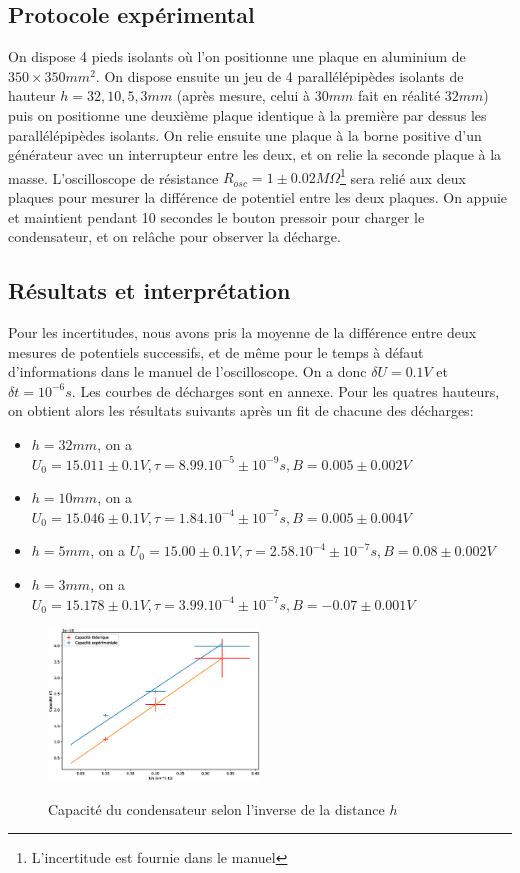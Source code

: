 \documentclass[12pt]{article}
\begin{document}
	\subsection{Protocole expérimental}
	On dispose 4 pieds isolants où l'on positionne une plaque en aluminium de $350\times 350mm^2$. On dispose ensuite un jeu de 4 parallélépipèdes isolants de hauteur $h = 32, 10, 5, 3mm$ (après mesure, celui à $30mm$ fait en réalité $32mm$) puis
	on positionne une deuxième plaque identique à la première par dessus les parallélépipèdes isolants. On relie ensuite une plaque à la borne positive d'un générateur avec un interrupteur entre les deux, et on relie la seconde plaque à la masse.
	L'oscilloscope de résistance $R_{osc}=1 \pm 0.02 M\Omega$\footnote{L'incertitude est fournie dans le manuel} sera relié aux deux plaques pour mesurer la différence de potentiel entre les deux plaques.
	On appuie et maintient pendant 10 secondes le bouton pressoir pour charger le condensateur, et on relâche pour observer la décharge.
	
	\subsection{Résultats et interprétation}
	Pour les incertitudes, nous avons pris la moyenne de la différence entre deux mesures de potentiels successifs, et de même pour le temps à défaut d'informations dans le manuel de l'oscilloscope.
	On a donc $\delta U = 0.1V$ et $\delta t = 10^{-6}s$. Les courbes de décharges sont en annexe.
	Pour les quatres hauteurs, on obtient alors les résultats suivants après un fit de chacune des décharges:
	\begin{itemize}
		\item $h=32mm$, on a $U_0 = 15.011 \pm 0.1V, \tau = 8.99.10^{-5} \pm 10^{-9}s, B = 0.005 \pm 0.002V$
		\item $h=10mm$, on a $U_0 = 15.046 \pm 0.1V, \tau = 1.84.10^{-4} \pm 10^{-7}s, B = 0.005 \pm 0.004V$
		\item $h=5mm$, on a $U_0 = 15.00 \pm 0.1V, \tau = 2.58.10^{-4} \pm 10^{-7}s, B = 0.08 \pm 0.002V$
		\item $h=3mm$, on a $U_0 = 15.178 \pm 0.1V, \tau = 3.99.10^{-4} \pm 10^{-7}s, B = -0.07 \pm 0.001V$
	\end{itemize}
	\begin{figure}[!h]
		\centering
		\includegraphics[width=0.5\textwidth]{img/C_over_h.eps}
		\label{fig:Capacite}
		\caption{Capacité du condensateur selon l'inverse de la distance $h$}
	\end{figure}
\end{document}
